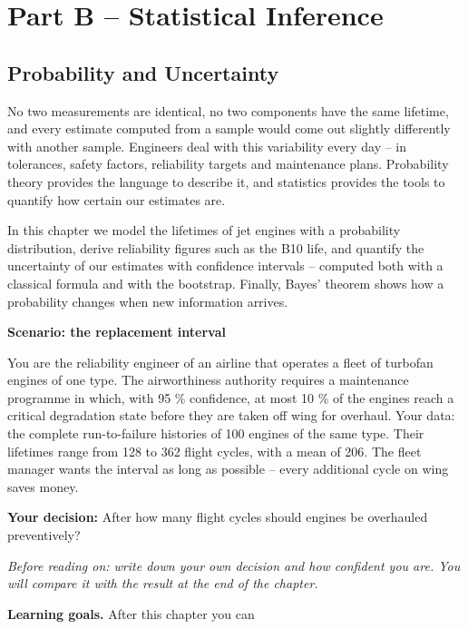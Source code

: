 \documentclass[
  letterpaper,
  DIV=11,
  numbers=noendperiod]{scrreprt}
\begin{document}
\part{Part B -- Statistical Inference}

\chapter{Probability and Uncertainty}\label{probability-and-uncertainty}

No two measurements are identical, no two components have the same
lifetime, and every estimate computed from a sample would come out
slightly differently with another sample. Engineers deal with this
variability every day -- in tolerances, safety factors, reliability
targets and maintenance plans. Probability theory provides the language
to describe it, and statistics provides the tools to quantify how
certain our estimates are.

In this chapter we model the lifetimes of jet engines with a probability
distribution, derive reliability figures such as the B10 life, and
quantify the uncertainty of our estimates with confidence intervals --
computed both with a classical formula and with the bootstrap. Finally,
Bayes' theorem shows how a probability changes when new information
arrives.

\textbf{Scenario: the replacement interval}

You are the reliability engineer of an airline that operates a fleet of
turbofan engines of one type. The airworthiness authority requires a
maintenance programme in which, with 95 \% confidence, at most 10 \% of
the engines reach a critical degradation state before they are taken off
wing for overhaul. Your data: the complete run-to-failure histories of
100 engines of the same type. Their lifetimes range from 128 to 362
flight cycles, with a mean of 206. The fleet manager wants the interval
as long as possible -- every additional cycle on wing saves money.

\textbf{Your decision:} After how many flight cycles should engines be
overhauled preventively?

\emph{Before reading on: write down your own decision and how confident
you are. You will compare it with the result at the end of the chapter.}

\textbf{Learning goals.} After this chapter you can
\end{document}
